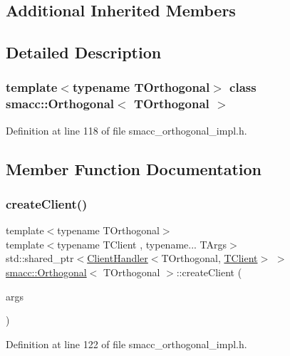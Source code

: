 \subsection*{Additional Inherited Members}


\subsection{Detailed Description}
\subsubsection*{template$<$typename T\+Orthogonal$>$\newline
class smacc\+::\+Orthogonal$<$ T\+Orthogonal $>$}



Definition at line 118 of file smacc\+\_\+orthogonal\+\_\+impl.\+h.



\subsection{Member Function Documentation}
\mbox{\label{classsmacc_1_1Orthogonal_aea19bfe584fe9c9580784a24b4690eab}} 
\subsubsection{\texorpdfstring{create\+Client()}{createClient()}}
{\footnotesize\ttfamily template$<$typename T\+Orthogonal$>$ \\
template$<$typename T\+Client , typename... T\+Args$>$ \\
std\+::shared\+\_\+ptr$<$\hyperlink{classsmacc_1_1ClientHandler}{Client\+Handler}$<$T\+Orthogonal, \hyperlink{classTClient}{T\+Client}$>$ $>$ \hyperlink{classsmacc_1_1Orthogonal}{smacc\+::\+Orthogonal}$<$ T\+Orthogonal $>$\+::create\+Client (\begin{DoxyParamCaption}\item[{T\+Args...}]{args }\end{DoxyParamCaption})\hspace{0.3cm}{\ttfamily [inline]}}



Definition at line 122 of file smacc\+\_\+orthogonal\+\_\+impl.\+h.


